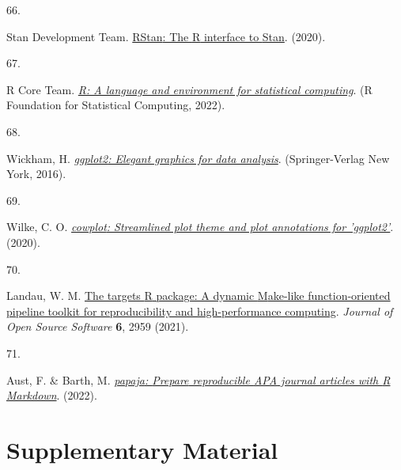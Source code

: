 \documentclass[
  man,floatsintext]{apa6}
\newlength{\cslhangindent}
\newlength{\csllabelwidth}
\newlength{\cslentryspacingunit} %
\newenvironment{CSLReferences}[2] %
 {%
  \setlength{\parindent}{0pt}
  \ifodd #1
  \let\oldpar\par
  \def\par{\hangindent=\cslhangindent\oldpar}
  \fi
  \setlength{\parskip}{#2\cslentryspacingunit}
 }%
 {}
\newcommand{\CSLLeftMargin}[1]{\parbox[t]{\csllabelwidth}{#1}}
\newcommand{\CSLRightInline}[1]{\parbox[t]{\linewidth - \csllabelwidth}{#1}\break}
\begin{document}
\begin{CSLReferences}{0}{0}
\leavevmode{}%
\CSLLeftMargin{66. }%
\CSLRightInline{Stan Development Team. \href{http://mc-stan.org/}{{RStan}: The {R} interface to {Stan}}. (2020).}

\leavevmode{}%
\CSLLeftMargin{67. }%
\CSLRightInline{R Core Team. \emph{\href{https://www.R-project.org/}{R: A language and environment for statistical computing}}. (R Foundation for Statistical Computing, 2022).}

\leavevmode{}%
\CSLLeftMargin{68. }%
\CSLRightInline{Wickham, H. \emph{\href{https://ggplot2.tidyverse.org}{{ggplot2}: Elegant graphics for data analysis}}. (Springer-Verlag New York, 2016).}

\leavevmode{}%
\CSLLeftMargin{69. }%
\CSLRightInline{Wilke, C. O. \emph{\href{https://CRAN.R-project.org/package=cowplot}{{cowplot}: Streamlined plot theme and plot annotations for 'ggplot2'}}. (2020).}

\leavevmode{}%
\CSLLeftMargin{70. }%
\CSLRightInline{Landau, W. M. \href{https://doi.org/10.21105/joss.02959}{The targets {R} package: A dynamic {M}ake-like function-oriented pipeline toolkit for reproducibility and high-performance computing}. \emph{Journal of Open Source Software} \textbf{6}, 2959 (2021).}

\leavevmode{}%
\CSLLeftMargin{71. }%
\CSLRightInline{Aust, F. \& Barth, M. \emph{\href{https://github.com/crsh/papaja}{{papaja}: {Prepare} reproducible {APA} journal articles with {R Markdown}}}. (2022).}

\end{CSLReferences}

\endgroup

\newpage
\vspace*{60mm}

\renewcommand{\figurename}{Supplementary Figure}
\renewcommand{\tablename}{Supplementary Table}
\renewcommand{\thefigure}{S\arabic{figure}} \setcounter{figure}{0}
\renewcommand{\thetable}{S\arabic{table}} \setcounter{table}{0}
\renewcommand{\theequation}{S\arabic{equation}} \setcounter{equation}{0}

\hypertarget{supplementary-material}{%
\section{\texorpdfstring{\textbf{Supplementary Material}}{Supplementary Material}}\label{supplementary-material}}
\end{document}
